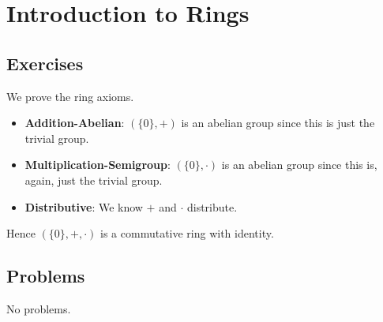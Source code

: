 \section{Introduction to Rings}
\subsection*{Exercises}
\begin{questions}
    \item We prove the ring axioms.
    \begin{itemize}
        \item \textbf{Addition-Abelian}: $(\{0\}, +)$ is an abelian group since this is just the trivial group.
        \item \textbf{Multiplication-Semigroup}: $(\{0\}, \cdot)$ is an abelian group since this is, again, just the trivial group.
        \item \textbf{Distributive}: We know $+$ and $\cdot$ distribute.
    \end{itemize}
    Hence $(\{0\}, +, \cdot)$ is a commutative ring with identity.
\end{questions}

\subsection*{Problems}
No problems.
